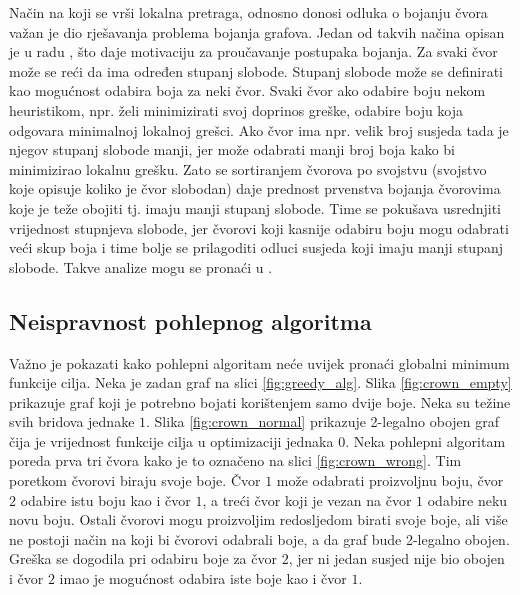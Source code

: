 \documentclass[times, utf8, diplomski, numeric]{fer}
\begin{document}
Način na koji se vrši lokalna pretraga, odnosno donosi odluka o bojanju čvora važan je dio rješavanja problema bojanja grafova. Jedan od takvih načina opisan je u radu \cite{lit11}, što daje motivaciju za proučavanje postupaka bojanja. Za svaki čvor može se reći da ima određen stupanj slobode. Stupanj slobode može se definirati kao mogućnost odabira boja za neki čvor. Svaki čvor ako odabire boju nekom heuristikom, npr. želi minimizirati svoj doprinos greške, odabire boju koja odgovara minimalnoj lokalnoj grešci. Ako čvor ima npr. velik broj susjeda tada je njegov stupanj slobode manji, jer može odabrati manji broj boja kako bi minimizirao lokalnu grešku. Zato se sortiranjem čvorova po svojstvu (svojstvo koje opisuje koliko je čvor slobodan) daje prednost prvenstva bojanja čvorovima koje je teže obojiti tj. imaju manji stupanj slobode. Time se pokušava usrednjiti vrijednost stupnjeva slobode, jer čvorovi koji kasnije odabiru boju mogu odabrati veći skup boja i time bolje se prilagoditi odluci susjeda koji imaju manji stupanj slobode. Takve analize mogu se pronaći u \cite{lit5, lit12}.

\subsection{Neispravnost pohlepnog algoritma}

Važno je pokazati kako pohlepni algoritam neće uvijek pronaći globalni minimum funkcije cilja. Neka je zadan graf na slici \ref{fig:greedy_alg}.
Slika \ref{fig:crown_empty} prikazuje graf koji je potrebno bojati korištenjem samo dvije boje. Neka su težine svih bridova jednake $1$. Slika \ref{fig:crown_normal} prikazuje 2-legalno obojen graf čija je vrijednost funkcije cilja u optimizaciji jednaka $0$. 
Neka pohlepni algoritam poreda prva tri čvora kako je to označeno na slici \ref{fig:crown_wrong}. Tim poretkom čvorovi biraju svoje boje. Čvor $1$ može odabrati proizvoljnu boju, čvor $2$ odabire istu boju kao i čvor $1$, a treći čvor koji je vezan na čvor $1$ odabire neku novu boju. Ostali čvorovi mogu proizvoljim redosljedom birati svoje boje, ali više ne postoji način na koji bi čvorovi odabrali boje, a da graf bude 2-legalno obojen. Greška se dogodila pri odabiru boje za čvor $2$, jer ni jedan susjed nije bio obojen i čvor $2$ imao je mogućnost odabira iste boje kao i čvor $1$.
\end{document}

